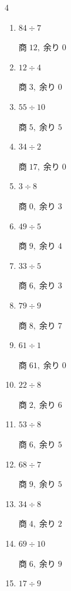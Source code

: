 \begin{multicols}{4}
\begin{enumerate}
        $商\; 20,\; 余り\; 1$

  \item $84 \div 7$

        $商\; 12,\; 余り\; 0$

  \item $12 \div 4$

        $商\; 3,\; 余り\; 0$

  \item $55 \div 10$

        $商\; 5,\; 余り\; 5$

  \item $34 \div 2$

        $商\; 17,\; 余り\; 0$

  \item $3 \div 8$

        $商\; 0,\; 余り\; 3$

  \item $49 \div 5$

        $商\; 9,\; 余り\; 4$

  \item $33 \div 5$

        $商\; 6,\; 余り\; 3$

  \item $79 \div 9$

        $商\; 8,\; 余り\; 7$

  \item $61 \div 1$

        $商\; 61,\; 余り\; 0$

  \item $22 \div 8$

        $商\; 2,\; 余り\; 6$

  \item $53 \div 8$

        $商\; 6,\; 余り\; 5$

  \item $68 \div 7$

        $商\; 9,\; 余り\; 5$

\columnbreak %

  \item $34 \div 8$

        $商\; 4,\; 余り\; 2$

  \item $69 \div 10$

        $商\; 6,\; 余り\; 9$

  \item $17 \div 9$


\end{enumerate}
\end{multicols}

